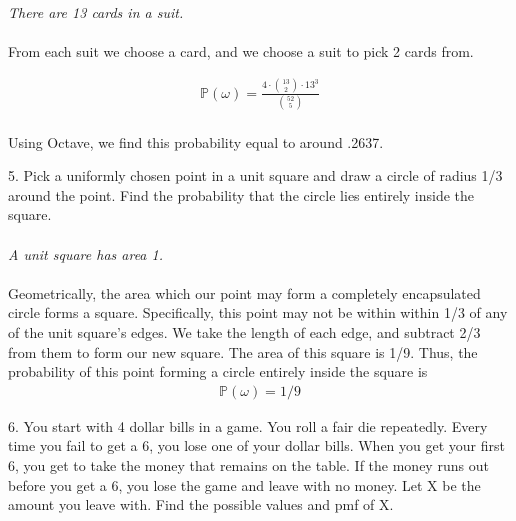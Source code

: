 \documentclass{article}
\begin{document}
\paragraph{}\emph{There are 13 cards in a suit.}

\paragraph{}From each suit we choose a card, and we choose a suit to pick 2 cards from. 

\begin{align*}
    \mathbb{P}(\omega) = \frac{4\cdot\binom{13}{2}\cdot13^{3}}{\binom{52}{5}}
\end{align*}
\paragraph{}Using Octave, we find this probability equal to around .2637.

\vspace{5mm}

5. Pick a uniformly chosen point in a unit square and draw a circle of radius 1/3 around
the point. Find the probability that the circle lies entirely inside the square.


\paragraph{}\emph{A unit square has area 1.}
\paragraph{}Geometrically, the area which our point may form a completely encapsulated circle forms a square.
Specifically, this point may not be within within 1/3 of any of the unit square's edges. We take the length
of each edge, and subtract 2/3 from them to form our new square. The area of this square is 1/9. Thus, the
probability of this point forming a circle entirely inside the square is 
\begin{align*}
    \mathbb{P}(\omega) = 1/9
\end{align*}

\vspace{5mm}

6. You start with 4 dollar bills in a game. You roll a fair die repeatedly. Every time you
fail to get a 6, you lose one of your dollar bills. When you get your first 6, you get to
take the money that remains on the table. If the money runs out before you get a 6,
you lose the game and leave with no money. Let X be the amount you leave with. Find
the possible values and pmf of X.
\end{document}
